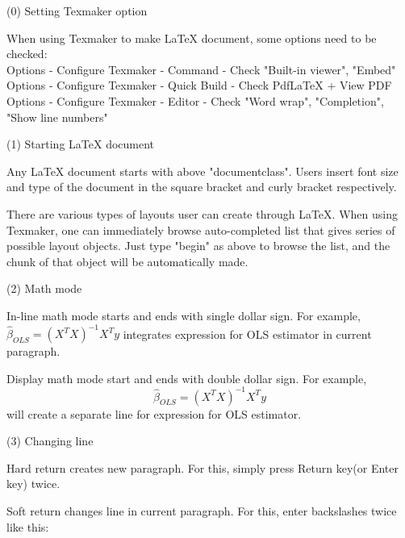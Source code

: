 \documentclass[11pt]{article}
\begin{document}
(0) Setting Texmaker option

When using Texmaker to make LaTeX document, some options need to be checked:\\
Options - Configure Texmaker - Command - Check "Built-in viewer", "Embed"\\
Options - Configure Texmaker - Quick Build - Check PdfLaTeX + View PDF\\
Options - Configure Texmaker - Editor - Check "Word wrap", "Completion", "Show
line numbers"

(1) Starting LaTeX document

Any LaTeX document starts with above "documentclass". Users insert font size and
type of the document in the square bracket and curly bracket respectively.

There are various types of layouts user can create through LaTeX. When using
Texmaker, one can immediately browse auto-completed list that gives series of
possible layout objects. Just type "begin" as above to browse the list, and the
chunk of that object will be automatically made.

(2) Math mode

In-line math mode starts and ends with single dollar sign. For example, 
$\hat{\beta}_{OLS}=(X^{T}X)^{-1}X^{T}y$ integrates expression for OLS estimator in
current paragraph.

Display math mode start and ends with double dollar sign. For example,
$$\hat{\beta}_{OLS}=(X^{T}X)^{-1}X^{T}y$$
will create a separate line for expression for OLS estimator.

(3) Changing line

Hard return creates new paragraph. For this, simply press Return key(or Enter key)
twice.

Soft return changes line in current paragraph. For this, enter backslashes twice like this: \\
\end{document}
